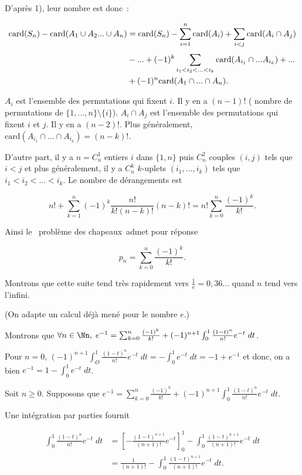 {\begin{enumerate}
{D'après 1), leur nombre est donc~:

\begin{align*}\ensuremath
\mbox{card}(S_n)-\mbox{card}(A_1\cup A_2...\cup A_n)
&=\mbox{card}(S_n)-\sum_{i=1}^{n}\mbox{card}(A_i)+\sum_{i<j}^{}\mbox{card}(A_i\cap A_j)\\
 &-...+(-1)^{k}\sum_{i_1<i_2<...<i_k}^{}\mbox{card}(A_{i_1}\cap...A_{i_k})+...\\
 &+(-1)^{n}\mbox{card}(A_1\cap...\cap A_n).
\end{align*} 

$A_i$ est l'ensemble des permutations qui fixent $i$. Il y en a $(n-1)!$ ( nombre de permutations de $\{1,...,n\}\setminus\{i\}$). $A_i\cap A_j$ est l'ensemble des permutations qui fixent $i$ et $j$. Il y en a $(n-2)!$. Plus généralement, $\mbox{card}(A_{i_1}\cap...\cap A_{i_k})=(n-k)!$.

D'autre part, il y a $n=C_n^1$ entiers $i$ dans $\{1,n\}$ puis $C_n^2$ couples $(i,j)$ tels que $i<j$ et plus généralement, il y a $C_n^k$ $k$-uplets $(i_1,...,i_k)$ tels que $i_1<i_2< ...<i_k$. Le nombre de dérangements est  

$$n!+\sum_{k=1}^{n}(-1)^k\frac{n!}{k!(n-k)!}(n-k)!=n!\sum_{k=0}^{n}\frac{(-1)^k}{k!}.$$
 
Ainsi le \og~problème des chapeaux~\fg admet pour réponse

$$p_n=\sum_{k=0}^{n}\frac{(-1)^k}{k!}.$$ 

Montrons que cette suite tend très rapidement vers $\frac{1}{e}=0,36...$ quand $n$ tend vers l'infini.

(On adapte un  calcul déjà mené pour le nombre $e$.)

Montrons que $\forall n\in\Nn,\;e^{-1}=\sum_{k=0}^{n}\frac{(-1)^k}{k!}+(-1)^{n+1}\int_{0}^{1}\frac{(1-t)^n}{n!}e^{-t}\;dt$.

Pour $n=0$, $(-1)^{n+1}\int_{O}^{1}\frac{(1-t)^n}{n!}e^{-t}\;dt=-\int_{0}^{1}e^{-t}\;dt=-1+e^{-1}$ et donc, on a bien $e^{-1}=1-\int_{0}^{1}e^{-t}\;dt$.

Soit $n\geq0$. Supposons que $e^{-1}=\sum_{k=0}^{n}\frac{(-1)^k}{k!}+(-1)^{n+1}\int_{0}^{1}\frac{(1-t)^n}{n!}e^{-t}\;dt$.

Une intégration par parties fournit

\begin{align*}
\int_{0}^{1}\frac{(1-t)^n}{n!}e^{-t}\;dt &= \left[-\frac{(1-t)^{n+1}}{(n+1)!}e^{-t}\right]_0^1-\int_{0}^{1}\frac{(1-t)^{n+1}}{(n+1)!}e^{-t}\;dt \\
&= \frac{1}{(n+1)!}-\int_{0}^{1}\frac{(1-t)^{n+1}}{(n+1)!}e^{-t}\;dt.
\end{align*}

}
\end{enumerate}}
